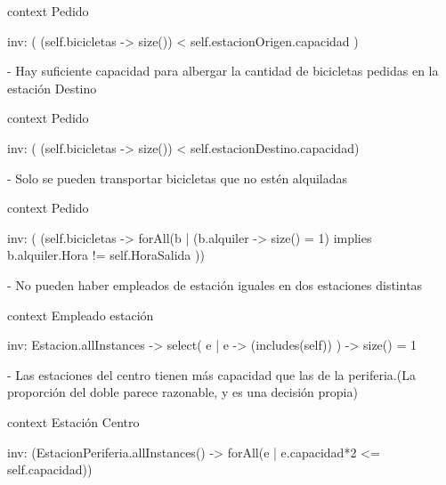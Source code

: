 context Pedido

inv: ( (self.bicicletas -> size()) < self.estacionOrigen.capacidad )



- Hay suficiente capacidad para albergar la cantidad de bicicletas pedidas en la estación Destino

context Pedido

inv: ( (self.bicicletas -> size()) < self.estacionDestino.capacidad)



- Solo se pueden transportar bicicletas que no estén alquiladas

context Pedido

inv: ( (self.bicicletas -> forAll(b | (b.alquiler -> size() = 1) implies b.alquiler.Hora != self.HoraSalida  ))



- No pueden haber empleados de estación iguales en dos estaciones distintas

context Empleado estación

inv: Estacion.allInstances -> select( e | e -> (includes(self)) ) -> size() = 1



- Las estaciones del centro tienen más capacidad que las de la periferia.(La proporción del doble parece razonable, y es
una decisión propia)

context Estación Centro

inv: (EstacionPeriferia.allInstances() -> forAll(e | e.capacidad*2 <= self.capacidad))








